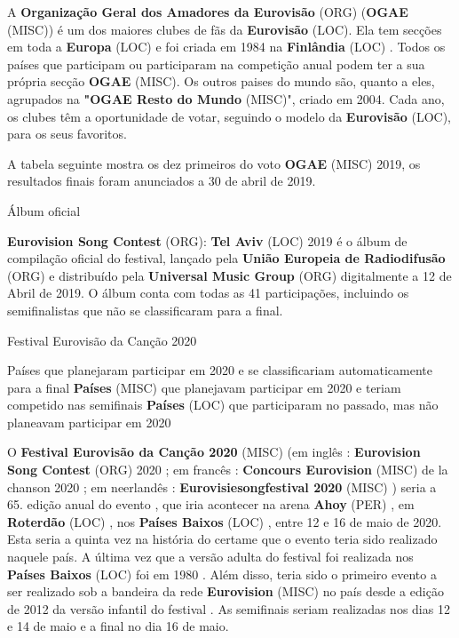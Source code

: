 \documentclass[12pt,a4paper]{article}
\begin{document}
A \textbf{Organização Geral dos Amadores da Eurovisão} (ORG) (\textbf{OGAE} (MISC)) é um dos maiores clubes de fãs da \textbf{Eurovisão} (LOC). Ela tem secções em toda a \textbf{Europa} (LOC) e foi criada em 1984 na \textbf{Finlândia} (LOC) . Todos os países que participam ou participaram na competição anual podem ter a sua própria secção \textbf{OGAE} (MISC). Os outros paises do mundo são, quanto a eles, agrupados na \textbf{"OGAE Resto do Mundo} (MISC)", criado em 2004. Cada ano, os clubes têm a oportunidade de votar, seguindo o modelo da \textbf{Eurovisão} (LOC), para os seus favoritos.

A tabela seguinte mostra os dez primeiros do voto \textbf{OGAE} (MISC) 2019, os resultados finais foram anunciados a 30 de abril de 2019.



Álbum oficial

\textbf{Eurovision Song Contest} (ORG): \textbf{Tel Aviv} (LOC) 2019 é o álbum de compilação oficial do festival, lançado pela \textbf{União Europeia de Radiodifusão} (ORG) e distribuído pela \textbf{Universal Music Group} (ORG) digitalmente a 12 de Abril de 2019. O álbum conta com todas as 41 participações, incluindo os semifinalistas que não se classificaram para a final.



Festival Eurovisão da Canção 2020



Países que planejaram participar em 2020 e se classificariam automaticamente para a final \textbf{Países} (MISC) que planejavam participar em 2020 e teriam competido nas semifinais \textbf{Países} (LOC) que participaram no passado, mas não planeavam participar em 2020

O \textbf{Festival Eurovisão da Canção 2020} (MISC) (em inglês : \textbf{Eurovision Song Contest} (ORG) 2020 ; em francês : \textbf{Concours Eurovision} (MISC) de la chanson 2020 ; em neerlandês : \textbf{Eurovisiesongfestival 2020} (MISC) ) seria a 65. edição anual do evento , que iria acontecer na arena \textbf{Ahoy} (PER) , em \textbf{Roterdão} (LOC) , nos \textbf{Países Baixos} (LOC) , entre 12 e 16 de maio de 2020. Esta seria a quinta vez na história do certame que o evento teria sido realizado naquele país. A última vez que a versão adulta do festival foi realizada nos \textbf{Países Baixos} (LOC) foi em 1980 . Além disso, teria sido o primeiro evento a ser realizado sob a bandeira da rede \textbf{Eurovision} (MISC) no país desde a edição de 2012 da versão infantil do festival . As semifinais seriam realizadas nos dias 12 e 14 de maio e a final no dia 16 de maio.
\end{document}
